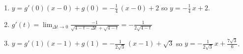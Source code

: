 \documentclass{ximera}
\begin{document}
\begin{question}
\begin{problem}
\begin{solution}
\begin{enumerate}
\item  $y = g'(0) (x - 0) + g(0) =  -\frac{1}{4} \, (x-0) + 2$ so $y = -\frac{1}{4} \, x +2$.

\item  $g'(t) = \lim_{\Delta t \rightarrow 0} \frac{-1}{\sqrt{4-t-\Delta t} + \sqrt{4-t}} = -\frac{1}{2 \sqrt{4-t}} $  

\item  $y = g'(1)(x-1)+g(1) = -\frac{1}{2 \sqrt{3}} \, (x-1) + \sqrt{3}$ so $y =  -\frac{1}{2 \sqrt{3}}  \, x + \frac{7 \sqrt{3}}{6}$.

\end{enumerate}

\end{solution}
\end{problem}

\end{question}
\end{document}
